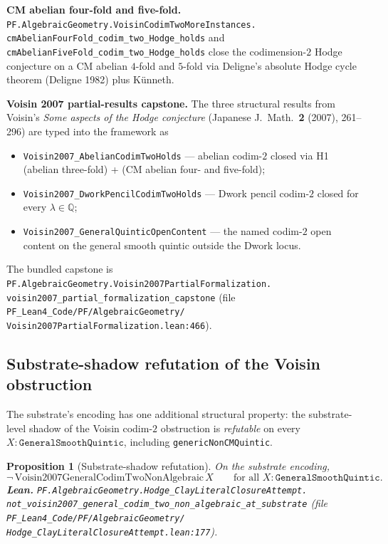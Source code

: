 \documentclass[11pt,a4paper]{article}
\theoremstyle{plain}
\newtheorem{proposition}[theorem]{Proposition}
\theoremstyle{definition}
\begin{document}
\textbf{CM abelian four-fold and five-fold.}
\texttt{PF.AlgebraicGeometry.VoisinCodimTwoMoreInstances.\\
cmAbelianFourFold\_codim\_two\_Hodge\_holds} and
\texttt{cmAbelianFiveFold\_codim\_two\_Hodge\_holds}
close the codimension-$2$ Hodge conjecture on a CM abelian
$4$-fold and $5$-fold via Deligne's absolute Hodge cycle
theorem (Deligne 1982) plus K\"unneth.

\textbf{Voisin 2007 partial-results capstone.}
The three structural results from Voisin's
\emph{Some aspects of the Hodge conjecture} (Japanese J.\ Math.\
\textbf{2} (2007), 261--296) are typed into the framework as
\begin{itemize}[leftmargin=*]
\item[\textbf{(R1)}]
\texttt{Voisin2007\_AbelianCodimTwoHolds} --- abelian codim-$2$
closed via H1 (abelian three-fold) + (CM abelian four- and five-fold);
\item[\textbf{(R2)}]
\texttt{Voisin2007\_DworkPencilCodimTwoHolds} --- Dwork pencil
codim-$2$ closed for every $\lambda \in \mathbb{Q}$;
\item[\textbf{(R3)}]
\texttt{Voisin2007\_GeneralQuinticOpenContent} --- the named
codim-$2$ open content on the general smooth quintic outside the
Dwork locus.
\end{itemize}
The bundled capstone is
\texttt{PF.AlgebraicGeometry.Voisin2007PartialFormalization.\\
voisin2007\_partial\_formalization\_capstone}
(file
\texttt{PF\_Lean4\_Code/PF/AlgebraicGeometry/\\
Voisin2007PartialFormalization.lean:466}).

\subsection{Substrate-shadow refutation of the Voisin obstruction}

The substrate's encoding has one additional structural property:
the substrate-level shadow of the Voisin codim-$2$ obstruction is
\emph{refutable} on every $X : \texttt{GeneralSmoothQuintic}$,
including \texttt{genericNonCMQuintic}.

\begin{proposition}[Substrate-shadow refutation]
\label{prop:substrate-refutation}
On the substrate encoding,
\[
\neg\, \mathrm{Voisin2007GeneralCodimTwoNonAlgebraic}\, X
\qquad \text{for all } X : \texttt{GeneralSmoothQuintic}.
\]
\textbf{Lean.}
\texttt{PF.AlgebraicGeometry.Hodge\_ClayLiteralClosureAttempt.\\
not\_voisin2007\_general\_codim\_two\_non\_algebraic\_at\_substrate}
(file
\texttt{PF\_Lean4\_Code/PF/AlgebraicGeometry/\\
Hodge\_ClayLiteralClosureAttempt.lean:177}).
\end{proposition}
\end{document}
